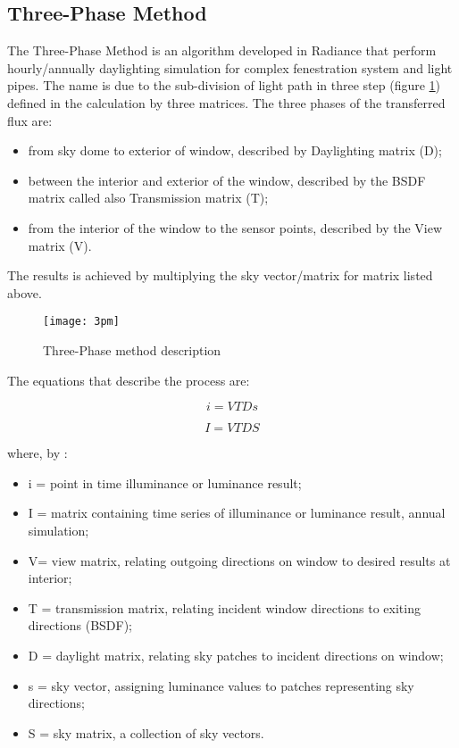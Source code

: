 \subsection{Three-Phase Method} \label{sec:3ph}

The Three-Phase Method \cite{3ph1,3ph2} is an algorithm developed in Radiance that perform hourly/annually daylighting simulation for complex fenestration system and light pipes. The name is due to the sub-division of light path in three step (figure \ref{img1:3pm}) defined in the calculation by three matrices.
The three phases of the transferred flux are:
\begin{itemize}
\item[1.] from sky dome to exterior of window, described by Daylighting matrix (D);
\item[2.] between the interior and exterior of the window, described by the BSDF matrix called also Transmission matrix (T);
\item[3.] from the interior of the window to  the sensor points, described by the View matrix (V).
\end{itemize}
The results is achieved by multiplying the sky vector/matrix for matrix listed above.

\begin{figure}[h]
\centering
\texttt{[image: 3pm]}
\caption{\label{img1:3pm} Three-Phase method description}
\end{figure}



The equations that describe the process are:

\begin{equation}\label{eq1:hour}
i= VTD s 
\end{equation}

\begin{equation}
 I = VTD S
\end{equation}

where, by \cite{3ph_tut} :
\begin{itemize}
\item i = point in time illuminance or luminance result;
\item I = matrix containing time series of illuminance or luminance result, annual simulation;
\item V= view matrix, relating outgoing directions on window to desired results at interior;
\item T = transmission matrix, relating incident window directions to exiting directions (BSDF);
\item D = daylight matrix, relating sky patches to incident directions on window;
\item s = sky vector, assigning luminance values to patches representing sky directions;
\item S = sky matrix, a collection of sky vectors.
\end{itemize}

